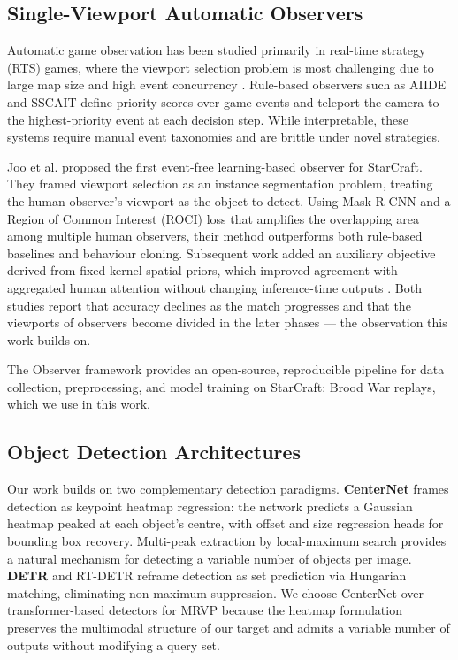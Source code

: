 \documentclass[preprint,12pt]{elsarticle}
\begin{document}
\subsection{Single-Viewport Automatic Observers}

Automatic game observation has been studied primarily in real-time strategy 
(RTS) games, where the viewport selection problem is most challenging due to 
large map size and high event concurrency \cite{ontanon2013survey}. 
Rule-based observers such as AIIDE and SSCAIT \cite{mattsson2015automatic} 
define priority scores over game events and teleport the camera to the 
highest-priority event at each decision step. While interpretable, these 
systems require manual event taxonomies and are brittle under novel strategies.

Joo et al. \cite{joo2023learning} proposed the first event-free learning-based 
observer for StarCraft. They framed viewport selection as an instance 
segmentation problem, treating the human observer's viewport as the object to 
detect. Using Mask R-CNN \cite{he2020mask} and a Region of Common Interest 
(ROCI) loss that amplifies the overlapping area among multiple human observers, 
their method outperforms both rule-based baselines and behaviour cloning. 
Subsequent work added an auxiliary objective derived from fixed-kernel spatial
priors, which improved agreement with aggregated human attention without
changing inference-time outputs \cite{anonymous2025kbrs}. Both studies report
that accuracy declines as the match progresses and that the viewports of
observers become divided in the later phases — the observation this work builds
on.

The Observer framework \cite{bae2025observer} provides an open-source, 
reproducible pipeline for data collection, preprocessing, and model training 
on StarCraft: Brood War replays, which we use in this work.

\subsection{Object Detection Architectures}

Our work builds on two complementary detection paradigms. 
\textbf{CenterNet} \cite{zhou2019objects} frames detection as keypoint 
heatmap regression: the network predicts a Gaussian heatmap peaked at each 
object's centre, with offset and size regression heads for bounding box 
recovery. Multi-peak extraction by local-maximum search provides a natural 
mechanism for detecting a variable number of objects per image. 
\textbf{DETR} \cite{carion2020end} and RT-DETR \cite{lv2023detrs} reframe 
detection as set prediction via Hungarian matching, eliminating 
non-maximum suppression. We choose CenterNet over transformer-based detectors 
for MRVP because the heatmap formulation preserves the multimodal structure of
our target and admits a variable number of outputs without modifying a query
set.
\end{document}

